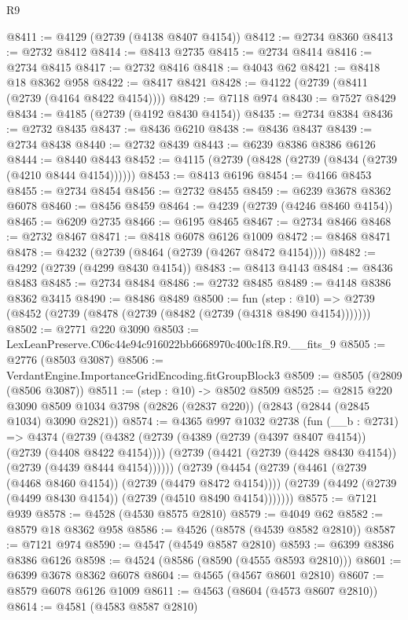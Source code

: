 \begin{lexlean}{R9}
\begin{coremodule}
@8411 := @4129 (@2739 (@4138 @8407 @4154))
@8412 := @2734 @8360
@8413 := @2732 @8412
@8414 := @8413 @2735
@8415 := @2734 @8414
@8416 := @2734 @8415
@8417 := @2732 @8416
@8418 := @4043 @62
@8421 := @8418 @18 @8362 @958
@8422 := @8417 @8421
@8428 := @4122 (@2739 (@8411 (@2739 (@4164 @8422 @4154))))
@8429 := @7118 @974
@8430 := @7527 @8429
@8434 := @4185 (@2739 (@4192 @8430 @4154))
@8435 := @2734 @8384
@8436 := @2732 @8435
@8437 := @8436 @6210
@8438 := @8436 @8437
@8439 := @2734 @8438
@8440 := @2732 @8439
@8443 := @6239 @8386 @8386 @6126
@8444 := @8440 @8443
@8452 := @4115 (@2739 (@8428 (@2739 (@8434 (@2739 (@4210 @8444 @4154))))))
@8453 := @8413 @6196
@8454 := @4166 @8453
@8455 := @2734 @8454
@8456 := @2732 @8455
@8459 := @6239 @3678 @8362 @6078
@8460 := @8456 @8459
@8464 := @4239 (@2739 (@4246 @8460 @4154))
@8465 := @6209 @2735
@8466 := @6195 @8465
@8467 := @2734 @8466
@8468 := @2732 @8467
@8471 := @8418 @6078 @6126 @1009
@8472 := @8468 @8471
@8478 := @4232 (@2739 (@8464 (@2739 (@4267 @8472 @4154))))
@8482 := @4292 (@2739 (@4299 @8430 @4154))
@8483 := @8413 @4143
@8484 := @8436 @8483
@8485 := @2734 @8484
@8486 := @2732 @8485
@8489 := @4148 @8386 @8362 @3415
@8490 := @8486 @8489
@8500 := fun (step : @10) =>
  @2739 (@8452 (@2739 (@8478 (@2739 (@8482 (@2739 (@4318 @8490 @4154)))))))
@8502 := @2771 @220 @3090
@8503 := LexLeanPreserve.C06c44e94c916022bb6668970c400c1f8.R9.__fits_9
@8505 := @2776 (@8503 @3087)
@8506 := VerdantEngine.ImportanceGridEncoding.fitGroupBlock3
@8509 := @8505 (@2809 (@8506 @3087))
@8511 := (step : @10) -> @8502 @8509
@8525 := @2815
    @220
    @3090
    @8509
    @1034
    @3798
    (@2826 (@2837 @220))
    (@2843 (@2844 (@2845 @1034) @3090 @2821))
@8574 := @4365
    @997
    @1032
    @2738
    (fun (__b : @2731) =>
    @4374
      (@2739
        (@4382
          (@2739 (@4389 (@2739 (@4397 @8407 @4154)) (@2739 (@4408 @8422 @4154))))
          (@2739 (@4421 (@2739 (@4428 @8430 @4154)) (@2739 (@4439 @8444 @4154))))))
      (@2739
        (@4454
          (@2739 (@4461 (@2739 (@4468 @8460 @4154)) (@2739 (@4479 @8472 @4154))))
          (@2739 (@4492 (@2739 (@4499 @8430 @4154)) (@2739 (@4510 @8490 @4154)))))))
@8575 := @7121 @939
@8578 := @4528 (@4530 @8575 @2810)
@8579 := @4049 @62
@8582 := @8579 @18 @8362 @958
@8586 := @4526 (@8578 (@4539 @8582 @2810))
@8587 := @7121 @974
@8590 := @4547 (@4549 @8587 @2810)
@8593 := @6399 @8386 @8386 @6126
@8598 := @4524 (@8586 (@8590 (@4555 @8593 @2810)))
@8601 := @6399 @3678 @8362 @6078
@8604 := @4565 (@4567 @8601 @2810)
@8607 := @8579 @6078 @6126 @1009
@8611 := @4563 (@8604 (@4573 @8607 @2810))
@8614 := @4581 (@4583 @8587 @2810)

\end{coremodule}
\end{lexlean}
